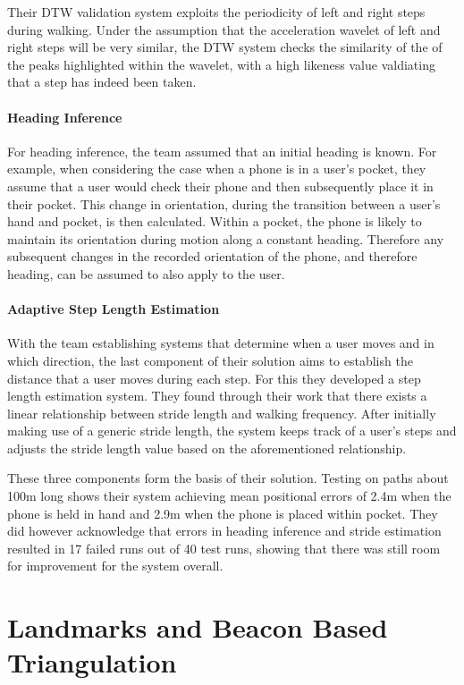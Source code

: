 \documentclass[12pt,a4paper]{report}
\begin{document}
Their DTW validation system exploits the periodicity of left and right steps during walking. Under the assumption that the acceleration wavelet of left and right steps will be very similar, the DTW system checks the similarity of the of the peaks highlighted within the wavelet, with a high likeness value valdiating that a step has indeed been taken.

\paragraph{Heading Inference}
For heading inference, the team assumed that an initial heading is known. For example, when considering the case when a phone is in a user's pocket, they assume that a user would check their phone and then subsequently place it in their pocket. This change in orientation, during the transition between a user's hand and pocket, is then calculated. Within a pocket, the phone is likely to maintain its orientation during motion along a constant heading. Therefore any subsequent changes in the recorded orientation of the phone, and therefore heading, can be assumed to also apply to the user.

\paragraph{Adaptive Step Length Estimation}
With the team establishing systems that determine when a user moves and in which direction, the last component of their solution aims to establish the distance that a user moves during each step. For this they developed a step length estimation system. They found through their work that there exists a linear relationship between stride length and walking frequency. After initially making use of a generic stride length, the system keeps track of a user's steps and adjusts the stride length value based on the aforementioned relationship. 

These three components form the basis of their solution. Testing on paths about 100m long shows their system achieving mean positional errors of 2.4m when the phone is held in hand and 2.9m when the phone is placed within pocket. They did however acknowledge that errors in heading inference and stride estimation resulted in 17 failed runs out of 40 test runs, showing that there was still room for improvement for the system overall.

\section{Landmarks and Beacon Based Triangulation}
\end{document}
